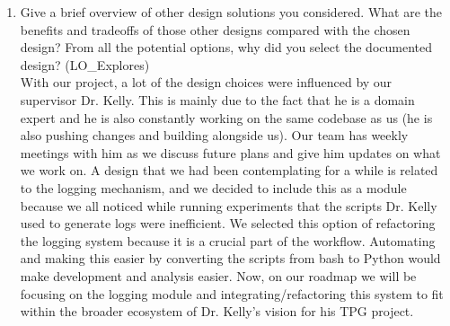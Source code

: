 \documentclass[12pt, titlepage]{article}
\begin{document}
\begin{enumerate}
  \item Give a brief overview of other design solutions you considered.  What
  are the benefits and tradeoffs of those other designs compared with the chosen
  design?  From all the potential options, why did you select the documented design?
  (LO\_Explores)\\
  
  With our project, a lot of the design choices were influenced by our supervisor Dr. Kelly. This is mainly due to the fact that he is a domain expert and he is also constantly working on the same codebase as us (he is also pushing changes and building alongside us). Our team has weekly meetings with him as we discuss future plans and give him updates on what we work on. A design that we had been contemplating for a while is related to the logging mechanism, and we decided to include this as a module because we all noticed while running experiments that the scripts Dr. Kelly used to generate logs were inefficient. We selected this option of refactoring the logging system because it is a crucial part of the workflow. Automating and making this easier by converting the scripts from bash to Python would make development and analysis easier. Now, on our roadmap we will be focusing on the logging module and integrating/refactoring this system to fit within the broader ecosystem of Dr. Kelly’s vision for his TPG project. 
\end{enumerate}
\end{document}
